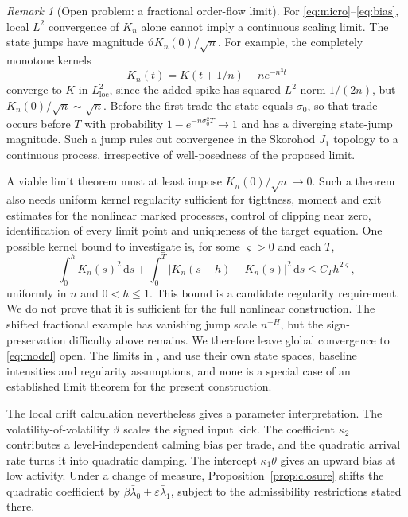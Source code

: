 \documentclass{rQUF2e}
\theoremstyle{plain}
\theoremstyle{definition}
\theoremstyle{remark}
\newtheorem{remark}[theorem]{Remark}
\newcommand{\D}{\mathrm{d}}
\begin{document}
\begin{remark}[Open problem: a fractional order-flow limit]\label{conj:limit}
For \eqref{eq:micro}--\eqref{eq:bias}, local $L^2$ convergence of $K_n$ alone cannot imply a continuous scaling limit. The state jumps have magnitude $\vartheta K_n(0)/\sqrt n$. For example, the completely monotone kernels
\begin{equation*}
K_n(t)=K(t+1/n)+n e^{-n^3t}
\end{equation*}
converge to $K$ in $L^2_{\mathrm{loc}}$, since the added spike has squared $L^2$ norm $1/(2n)$, but $K_n(0)/\sqrt n\sim\sqrt n$. Before the first trade the state equals $\sigma_0$, so that trade occurs before $T$ with probability $1-e^{-n\sigma_0^2T}\to1$ and has a diverging state-jump magnitude. Such a jump rules out convergence in the Skorohod $J_1$ topology to a continuous process, irrespective of well-posedness of the proposed limit.
\end{remark}

A viable limit theorem must at least impose $K_n(0)/\sqrt n\to0$. Such a theorem also needs uniform kernel regularity sufficient for tightness, moment and exit estimates for the nonlinear marked processes, control of clipping near zero, identification of every limit point and uniqueness of the target equation. One possible kernel bound to investigate is, for some $\varsigma>0$ and each $T$,
\begin{equation*}
\int_0^h K_n(s)^2\,\D s+\int_0^T|K_n(s+h)-K_n(s)|^2\,\D s\le C_T h^{2\varsigma},
\end{equation*}
uniformly in $n$ and $0<h\le1$. This bound is a candidate regularity requirement. We do not prove that it is sufficient for the full nonlinear construction. The shifted fractional example has vanishing jump scale $n^{-H}$, but the sign-preservation difficulty above remains. We therefore leave global convergence to \eqref{eq:model} open. The limits in \citet{DandapaniJusselinRosenbaum2021}, \citet{HorstXuZhang2024} and \citet{HagerHorstWagenhoferXu2026} use their own state spaces, baseline intensities and regularity assumptions, and none is a special case of an established limit theorem for the present construction.

The local drift calculation nevertheless gives a parameter interpretation. The volatility-of-volatility $\vartheta$ scales the signed input kick. The coefficient $\kappa_2$ contributes a level-independent calming bias per trade, and the quadratic arrival rate turns it into quadratic damping. The intercept $\kappa_1\theta$ gives an upward bias at low activity. Under a change of measure, Proposition~\ref{prop:closure} shifts the quadratic coefficient by $\beta\bar\lambda_0+\varepsilon\bar\lambda_1$, subject to the admissibility restrictions stated there.
\end{document}
